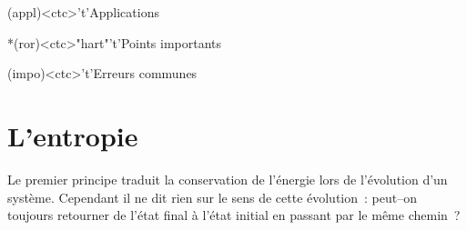 \documentclass[../../main/main.tex]{subfiles}
\begin{document}
\begin{tcn}[sidebyside, fontupper=\small, fontlower=\small]
	\begin{tcn}(appl)<ctc>'t'{Applications}
	\end{tcn}
	\begin{tcn}*(ror)<ctc>"hart"'t'{Points importants}
	\end{tcn}
	\begin{tcn}(impo)<ctc>'t'{Erreurs communes}
	\end{tcn}
\end{tcn}

\vspace*{\fill}
\newpage

\section{L'entropie}

Le premier principe traduit la conservation de l'énergie lors de l'évolution
d'un système. Cependant il ne dit rien sur le sens de cette évolution~: peut–on
toujours retourner de l'état final à l'état initial en passant par le même
chemin~?
\end{document}

